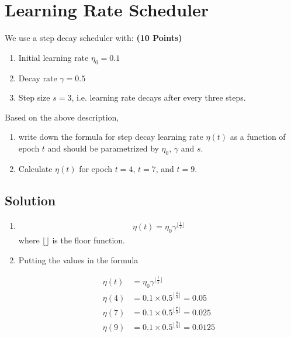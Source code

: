 \documentclass[12pt, xcolor=dvipsnames,svgnames,x11names]{article}
\begin{document}
\section{Learning Rate Scheduler}

We use a step decay scheduler with: \hfill \textbf{(10 Points)}

\begin{enumerate}
\item Initial learning rate $\eta_0 = 0.1$
\item Decay rate $\gamma = 0.5$
\item Step size $s = 3$, i.e. learning rate decays after every three steps.
\end{enumerate}

Based on the above description, 

\begin{enumerate}
\item write down the formula for step decay learning rate $\eta(t)$ as a function of epoch $t$ and should be parametrized by $\eta_0$, $\gamma$ and $s$.
\item Calculate $\eta(t)$ for epoch $t=4$, $t = 7$, and $t = 9$.
\end{enumerate}


\subsection{Solution}

\begin{enumerate}

\item 

\begin{align*}
\eta(t) = \eta_0\gamma^{\lfloor \tfrac{t}{s} \rfloor}
\end{align*}
where $ \lfloor  \rfloor $ is the floor function.

\item Putting the values in the formula

\begin{align*}
\eta(t) & = \eta_0\gamma^{\lfloor \tfrac{t}{s} \rfloor}\\
\eta(4) & = 0.1 \times 0.5 ^{\lfloor \tfrac{4}{3} \rfloor} =0.05\\
\eta(7) & = 0.1 \times 0.5 ^{\lfloor \tfrac{7}{3} \rfloor} = 0.025\\
\eta(9) & = 0.1 \times 0.5 ^{\lfloor \tfrac{9}{3} \rfloor} = 0.0125
\end{align*}


\end{enumerate}
\end{document}
